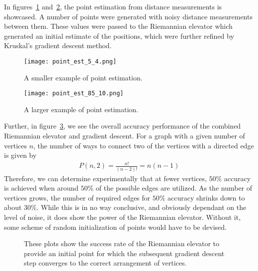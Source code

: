 In figures~\ref{fig:point-est-small} and~\ref{fig:point-est-large}, the point estimation from distance measurements is showcased. A number of points were generated with noisy distance measurements between them. These values were passed to the Riemannian elevator which generated an initial estimate of the positions, which were further refined by Kruskal's gradient descent method.
\begin{figure}[ht]
    \centering
    \texttt{[image: point\_est\_5\_4.png]}
    \caption{A smaller example of point estimation.}
    \label{fig:point-est-small}
\end{figure}
\begin{figure}[ht]
    \centering
    \texttt{[image: point\_est\_85\_10.png]}
    \caption{A larger example of point estimation.}
    \label{fig:point-est-large}
\end{figure}
Further, in figure~\ref{fig:RE-accuracy}, we see the overall accuracy performance of the combined Riemannian elevator and gradient descent. For a graph with a given number of vertices $n$, the number of ways to connect two of the vertices with a directed edge is given by 
\begin{align}
    P(n, 2) = \frac{n!}{(n-2)!} = n (n-1)
\end{align}
Therefore, we can determine experimentally that at fewer vertices, $50\%$ accuracy is achieved when around $50\%$ of the possible edges are utilized. As the number of vertices grows, the number of required edges for $50\%$ accuracy shrinks down to about $30\%$. While this is in no way conclusive, and obviously dependant on the level of noise, it does show the power of the Riemannian elevator. Without it, some scheme of random initialization of points would have to be devised.
\begin{figure}[ht]
    \centering
    
    \caption{These plots show the success rate of the Riemannian elevator to provide an initial point for which the subsequent gradient descent step converges to the correct arrangement of vertices.}
    \label{fig:RE-accuracy}
\end{figure}

